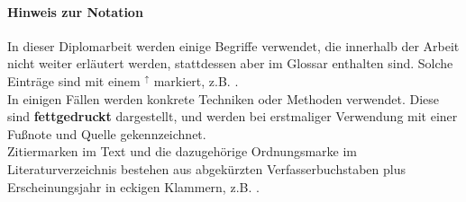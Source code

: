 \paragraph{Hinweis zur Notation} In dieser Diplomarbeit werden einige Begriffe verwendet, die innerhalb der Arbeit nicht weiter erläutert werden, stattdessen aber im Glossar enthalten sind. Solche Einträge sind mit einem $^\uparrow$ markiert, z.B. .\\
In einigen Fällen werden konkrete Techniken oder Methoden verwendet. Diese sind \textbf{fettgedruckt} dargestellt, und werden bei erstmaliger Verwendung mit einer Fußnote und Quelle gekennzeichnet.\\
Zitiermarken im Text und die dazugehörige Ordnungsmarke im Literaturverzeichnis bestehen aus abgekürzten Verfasserbuchstaben plus Erscheinungsjahr in eckigen Klammern, z.B. \citep{beck_test_2002}.
